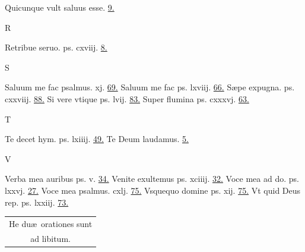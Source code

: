 \documentclass[a5paper,10pt]{book}
\def\ae{æ}
\begin{document}
\begin{multicols}{2}
\newline Quicunque vult saluus esse. \hfill \hyperlink{QUICVMQUE}{9.}
\newline \vspace{-1.75em}
\begin{center}
\color{red} R
\end{center}
\vspace{-.75em}
\par \noindent Retribue seruo. ps. cxviij. \hfill \hyperlink{ps118.2}{8.}
\newline \vspace{-1.75em}
\begin{center}
\color{red} S
\end{center}
\vspace{-.75em}
\par \noindent Saluum me fac psalmus. xj. \hfill \hyperlink{ps11}{69.}
\newline Saluum me fac ps. lxviij. \hfill \hyperlink{ps68}{66.}
\newline S\ae pe expugna. ps. cxxviij. \hfill \hyperlink{ps128}{88.}
\newline Si vere vtique ps. lvij. \hfill \hyperlink{ps57}{83.}
\newline Super flumina ps. cxxxvj. \hfill \hyperlink{ps136}{63.}
\newline \vspace{-1.75em}
\begin{center}
\color{red} T
\end{center}
\vspace{-.75em}
\par \noindent Te decet hym. ps. lxiiij. \hfill \hyperlink{ps64}{49.}
\newline Te Deum laudamus. \hfill \hyperlink{tedeum}{5.}
\newline \vspace{-1.75em}
\begin{center}
\color{red} V
\end{center}
\vspace{-.75em}
\par \noindent Verba mea auribus ps. v. \hfill \hyperlink{ps5}{34.}
\newline Venite exultemus ps. xciiij. \hfill \hyperlink{ps94}{32.}%
\newline Voce mea ad do. ps. lxxvj. \hfill \hyperlink{ps76}{27.}
\newline Voce mea psalmus. cxlj. \hfill \hyperlink{ps141}{75.}
\newline Vsquequo domine ps. xij. \hfill \hyperlink{ps12}{75.}
\newline Vt quid Deus rep. ps. lxxiij. \hfill \hyperlink{ps73}{73.}
\begin{center}
\begin{tabular}{l r}
\multicolumn{2}{c}{He du\ae \ orationes sunt}\\
\multicolumn{2}{c}{ad libitum.}
\end{tabular}
\end{center}
\end{multicols}
\end{document}
